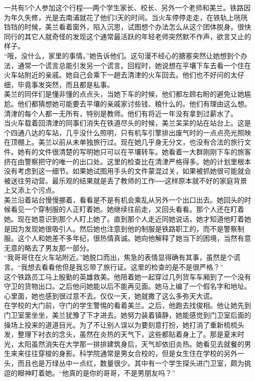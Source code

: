 \begin{multicols}{\theparacolNo}
一共有5个人参加这个行程──两个学生家长、校长、另外一个老师和美兰。铁路因为年久失修，光是去南浦就花了他们3天的时间。当火车停停走走，在铁轨上咣咣铛铛的时候，美兰看着窗外，陷入沉思，试图想个办法怎么从这个团体脱身。很快同行的其它人就奇怪的发现这个通常最活跃的年轻老师突然默不作声，欲言又止的样子。\\

“哦，没什么，家里的事情。”她告诉他们。这句漫不经心的搪塞突然让她想到个办法，通常一个谎言总能引发另一个谎言。回程时，她说想在平壤下车去看一个住在火车站附近的亲戚。她自己会乘下一趟去清津的火车回去。他们也不好问的太仔细，毕竟事发突然，而且都是私事。\\

美兰的同伴们是懂非懂的点点头，当她下车的时候，他们都左顾右盼的避免让她尴尬。他们都猜想她可能要去平壤的亲戚家讨些钱、粮什么的。他们有理由这么想。清津的每个人都一无所有，特别是教师。他们有将近一年没有拿到过薪水了。\\

当火车载着回清津的同事们消失在铁道尽头的时候，美兰呆呆的站在站台上。这是个四通八达的车站，几乎没什么照明，只有机车引擎排出废气时的一点点亮光照映在顶棚上。美兰以前从未单独旅行过。现在她几乎身无分文，也没有合法的旅行文件。她有的文件很清楚的写明她只可以在平壤转车。她看着一大群刚刚下车的旅客挤在由警察把守的唯一的出口处。这里的检查比在清津严格得多。她的计划里根本没有考虑到这一细节。如果她试图用手头的文件蒙混过关，如果被抓她很可能就会被送往劳动营。最乐观的结果就是丢了教师的工作──这样原本就不好的家庭背景上又添上个污点。\\

美兰沿着站台慢慢挪着，看看是不是有机会乘乱从另外一个出口出去。她回头的时候看见一个穿制服的人正盯着她。她继续往前走，又回头看看。那个人还在盯着她。现在她意识到那个人盯上她了。直到那个人走近同她说话，她才知道他盯着她是因为发现她很吸引人。然后她也注意到他的制服是铁路职工的，而不是警察制服。这个人和她差不多年纪，很热情真诚。她向他解释了她当下的困境，当然有意无意的略去了男友那一部分。\\

“我哥哥住在火车站附近。”她脱口而出，焦急的表情显得确有其事，虽然是个谎言。“我想去看看他但是我忘带了旅行证。这里的检查的是不是很严格？”\\

这个铁路员工马上殷勤的英雄救美。他陪着她一起穿过几列货车车厢到了一个没有守卫的货物出口。之后他问她能以后不能再见面。她马上编了一个假名字和地址。心里面，她也感到很过意不去。仅仅一天，她就撒了这么多弥天大谎。\\

在学校的大门前，守门的学生警惕的看着美兰。之后，他跑去找俊相。他让她先到门卫室里坐坐，美兰犹豫了下才进去。她努力装着镇静，她能感觉到门卫室后面的操场上投来的道道目光。为了不让别人误以为要刻意打扮，她打消了重新梳梳头发，整理下衬衣的念头，虽然在炎热的天气下，这些都贴着身上了。那是夏末时光，太阳虽然消失在大学那一排排建筑身后，天气却依旧炎热。她看见去就餐的男生来来往往穿梭的身影。科学院通常是男女合校的，但是女生住在学校的另外一头，而且也是万绿丛中一点红，数量很少。其中有一个学生探头进门卫室，颇为挑逗的眼神盯着她。“他真的是你的哥哥，不是男朋友吗？”\\


\end{multicols}
